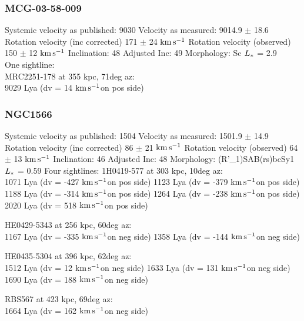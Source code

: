 \documentclass[iop]{emulateapj-rtx4}
\newcommand{\kms}{$\rm km\, s^{-1}$}
\begin{document}
%


\subsubsection{MCG-03-58-009}
Systemic velocity as published: 9030
Velocity as measured: 9014.9 $\pm$ 18.6
Rotation velocity (inc corrected) 171 $\pm$ 24 \kms
Rotation velocity (observed) 150 $\pm$ 12 \kms
Inclination: 48
Adjusted Inc: 49
Morphology: Sc
$L_{\**}$ = 2.9 \\

One sightline: \\
MRC2251-178 at 355 kpc, 71deg az: \\
9029 Lya (dv = 14 \kms on pos side)



\subsubsection{NGC1566}
Systemic velocity as published: 1504
Velocity as measured: 1501.9 $\pm$ 14.9
Rotation velocity (inc corrected) 86 $\pm$ 21 \kms
Rotation velocity (observed) 64 $\pm$ 13 \kms
Inclination: 46
Adjusted Inc: 48
Morphology: (R'\_1)SAB(rs)bcSy1
$L_{\**}$ = 0.59
Four sightlines: 
1H0419-577 at 303 kpc, 10deg az: \\
1071 Lya (dv = -427 \kms on pos side)
1123 Lya (dv = -379 \kms on pos side)
1188 Lya (dv = -314 \kms on pos side)
1264 Lya (dv = -238 \kms on pos side)
2020 Lya (dv = 518 \kms on pos side)

HE0429-5343 at 256 kpc, 60deg az: \\
1167 Lya (dv = -335 \kms on neg side)
1358 Lya (dv = -144 \kms on neg side)

HE0435-5304 at 396 kpc, 62deg az: \\
1512 Lya (dv = 12 \kms on neg side)
1633 Lya (dv = 131 \kms on neg side)
1690 Lya (dv = 188 \kms on neg side)

RBS567 at 423 kpc, 69deg az: \\
1664 Lya (dv = 162 \kms on neg side)
\end{document}

